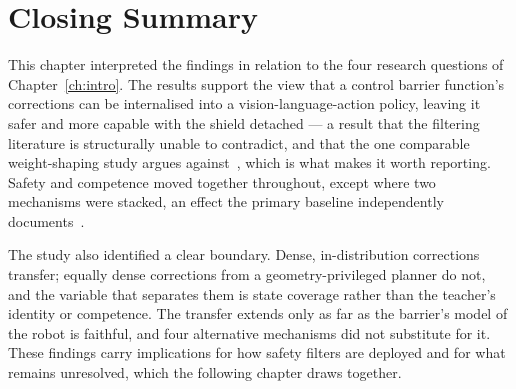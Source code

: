 \section{Closing Summary}\label{sec:disc:summary}

This chapter interpreted the findings in relation to the four research questions of
Chapter~\ref{ch:intro}. The results support the view that a control barrier function's corrections
can be internalised into a vision-language-action policy, leaving it safer and more capable with
the shield detached --- a result that the filtering literature is structurally unable to
contradict, and that the one comparable weight-shaping study argues against~\cite{guerrier2025guardrails},
which is what makes it worth reporting. Safety and competence moved together throughout, except
where two mechanisms were stacked, an effect the primary baseline independently
documents~\cite{vlsa2026}.

The study also identified a clear boundary. Dense, in-distribution corrections transfer; equally
dense corrections from a geometry-privileged planner do not, and the variable that separates them
is state coverage rather than the teacher's identity or competence. The transfer extends only as
far as the barrier's model of the robot is faithful, and four alternative mechanisms did not
substitute for it. These findings carry implications for how safety filters are deployed and for
what remains unresolved, which the following chapter draws together.
